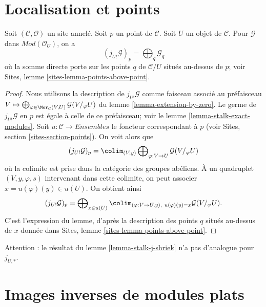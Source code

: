 \section{Localisation et points}
\label{section-localize-points}

\begin{lemma}
\label{lemma-stalk-j-shriek}
Soit $(\mathcal{C}, \mathcal{O})$ un site annelé.
Soit $p$ un point de $\mathcal{C}$. Soit $U$ un objet de $\mathcal{C}$.
Pour $\mathcal{G}$ dans $\textit{Mod}(\mathcal{O}_U)$, on a
$$
(j_{U!}\mathcal{G})_p =
\bigoplus\nolimits_q \mathcal{G}_q
$$
où la somme directe porte sur les points $q$ de $\mathcal{C}/U$ situés
au-dessus de $p$; voir Sites, lemme \ref{sites-lemma-points-above-point}.
\end{lemma}

\begin{proof}
Nous utilisons la description de $j_{U!}\mathcal{G}$ comme faisceau associé au préfaisceau
$V \mapsto
\bigoplus\nolimits_{\varphi \in \Mor_\mathcal{C}(V, U)}
\mathcal{G}(V/_\varphi U)$
du lemme \ref{lemma-extension-by-zero}. Le germe de $j_{U!}\mathcal{G}$ en
$p$ est égale à celle de ce préfaisceau; voir le
lemme \ref{lemma-stalk-exact-modules}. Soit
$u : \mathcal{C} \to \textit{Ensembles}$ le foncteur correspondant à $p$
(voir Sites, section \ref{sites-section-points}). On voit alors que
$$
(j_{U!}\mathcal{G})_p = \colim_{(V, y)}
\bigoplus\nolimits_{\varphi : V \to U} \mathcal{G}(V/_\varphi U)
$$
où la colimite est prise dans la catégorie des groupes abéliens.
À un quadruplet $(V, y, \varphi, s)$ intervenant dans cette colimite, on peut
associer $x = u(\varphi)(y) \in u(U)$. On obtient ainsi
$$
(j_{U!}\mathcal{G})_p =
\bigoplus\nolimits_{x \in u(U)}
\colim_{(\varphi : V \to U, y), \ u(\varphi)(y) = x} \mathcal{G}(V/_\varphi U).
$$
C'est l'expression du lemme, d'après la description des points $q$ situés
au-dessus de $x$ donnée dans Sites,
lemme \ref{sites-lemma-points-above-point}.
\end{proof}

\begin{remark}
\label{remark-not-pushforward}
Attention : le résultat du lemme \ref{lemma-stalk-j-shriek} n'a pas d'analogue
pour $j_{U, *}$.
\end{remark}












\section{Images inverses de modules plats}
\label{section-pullback-flat}

